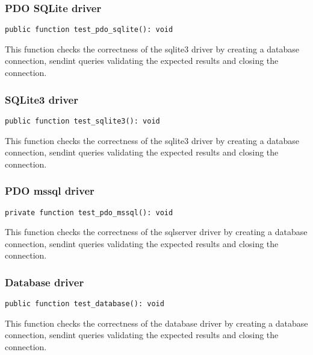 \documentclass[a4paper]{article}
\begin{document}
\hypertarget{toc136}{}
\subsubsection{PDO SQLite driver}

\begin{lstlisting}
public function test_pdo_sqlite(): void
\end{lstlisting}

This function checks the correctness of the sqlite3 driver by creating a
database connection, sendint queries validating the expected results and
closing the connection.

\hypertarget{toc137}{}
\subsubsection{SQLite3 driver}

\begin{lstlisting}
public function test_sqlite3(): void
\end{lstlisting}

This function checks the correctness of the sqlite3 driver by creating a
database connection, sendint queries validating the expected results and
closing the connection.

\hypertarget{toc138}{}
\subsubsection{PDO mssql driver}

\begin{lstlisting}
private function test_pdo_mssql(): void
\end{lstlisting}

This function checks the correctness of the sqlserver driver by creating a
database connection, sendint queries validating the expected results and
closing the connection.

\hypertarget{toc139}{}
\subsubsection{Database driver}

\begin{lstlisting}
public function test_database(): void
\end{lstlisting}

This function checks the correctness of the database driver by creating a
database connection, sendint queries validating the expected results and
closing the connection.
\end{document}
